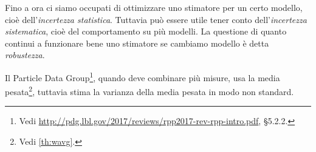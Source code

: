 
Fino a ora ci siamo occupati di ottimizzare uno stimatore per un certo modello,
cioè dell'\emph{incertezza statistica}.
Tuttavia può essere utile tener conto dell'\emph{incertezza sistematica},
cioè del comportamento su più modelli.
La questione di quanto continui a funzionare bene uno stimatore se cambiamo modello è detta \emph{robustezza}.

\begin{example}
	Il Particle Data Group\footnote{Vedi \url{http://pdg.lbl.gov/2017/reviews/rpp2017-rev-rpp-intro.pdf}, §5.2.2.}, quando deve combinare più misure, usa la media pesata\footnote{Vedi \autoref{th:wavg}.}, tuttavia stima la varianza della media pesata in modo non standard.
\end{example}

